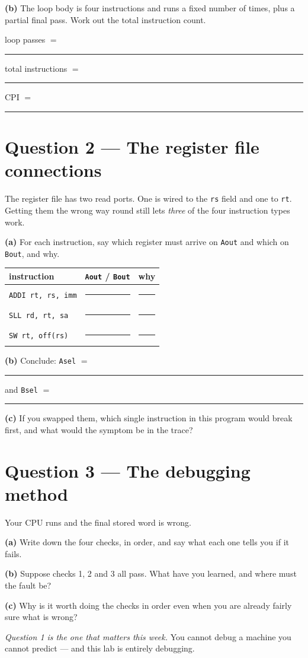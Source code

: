 \documentclass[11pt]{article}
\newcommand{\code}[1]{\texttt{#1}}
\newcommand{\answerbox}[1]{\vspace{2pt}\fbox{\parbox[c][#1][c]{\dimexpr\linewidth-2\fboxsep-2\fboxrule}{\ }}\vspace{4pt}}
\begin{document}
\textbf{(b)} The loop body is four instructions and runs a fixed number of
times, plus a partial final pass. Work out the total instruction count.

\vspace{4pt}
loop passes $=$ \rule{2cm}{0.4pt} \hfill total instructions $=$ \rule{2cm}{0.4pt}
\hfill CPI $=$ \rule{1.5cm}{0.4pt}
\vspace{6pt}

\answerbox{1.6cm}

\section*{Question 2 --- The register file connections}

The register file has two read ports. One is wired to the \code{rs} field and
one to \code{rt}. Getting them the wrong way round still lets \emph{three} of
the four instruction types work.

\textbf{(a)} For each instruction, say which register must arrive on
\code{Aout} and which on \code{Bout}, and why.

\begin{center}
\begin{tabular}{lp{4.2cm}p{6.4cm}}
\toprule
instruction & \code{Aout} / \code{Bout} & why \\
\midrule
\code{ADDI rt, rs, imm} & \rule{4cm}{0.4pt} & \rule{6.2cm}{0.4pt} \\[7pt]
\code{SLL rd, rt, sa} & \rule{4cm}{0.4pt} & \rule{6.2cm}{0.4pt} \\[7pt]
\code{SW rt, off(rs)} & \rule{4cm}{0.4pt} & \rule{6.2cm}{0.4pt} \\
\bottomrule
\end{tabular}
\end{center}

\textbf{(b)} Conclude: \code{Asel} $=$ \rule{2.5cm}{0.4pt} \quad and \quad
\code{Bsel} $=$ \rule{2.5cm}{0.4pt}

\textbf{(c)} If you swapped them, which single instruction in this program would
break first, and what would the symptom be in the trace?

\answerbox{2.0cm}

\section*{Question 3 --- The debugging method}

Your CPU runs and the final stored word is wrong.

\textbf{(a)} Write down the four checks, in order, and say what each one tells
you if it fails.

\answerbox{4.2cm}

\textbf{(b)} Suppose checks 1, 2 and 3 all pass. What have you learned, and
where must the fault be?

\answerbox{1.8cm}

\textbf{(c)} Why is it worth doing the checks in order even when you are already
fairly sure what is wrong?

\answerbox{1.6cm}

\vfill
{\small\emph{Question 1 is the one that matters this week.} You cannot debug a
machine you cannot predict --- and this lab is entirely debugging.}
\end{document}
